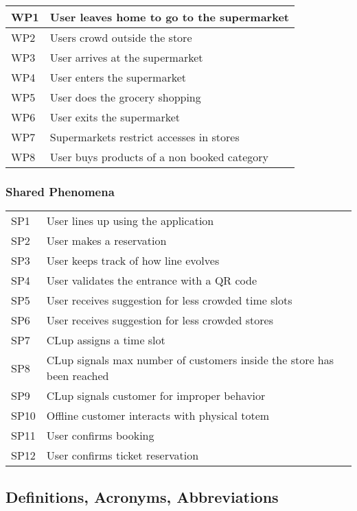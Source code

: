 \begin{tabular}{l|l}
	WP1 & User leaves home to go to the supermarket\\\hline
	WP2 & Users crowd outside the store\\\hline
    WP3 & User arrives at the supermarket\\\hline
    WP4 & User enters the supermarket \\\hline
	WP5 & User does the grocery shopping \\\hline
	WP6 & User exits the supermarket\\\hline
	WP7 & Supermarkets restrict accesses in stores\\\hline %
	WP8 & User buys products of a non booked category\\\hline %
\end{tabular}

\subsubsection{Shared Phenomena}
\begin{tabular}{l|l}
	SP1 & User lines up using the application \\
	SP2 & User makes a reservation \\
	SP3 & User keeps track of how line evolves \\
	SP4 & User validates the entrance with a QR code \\
	SP5 & User receives suggestion for less crowded time slots \\
	SP6 & User receives suggestion for less crowded stores \\
	SP7 & CLup assigns a time slot \\
	SP8 & CLup signals max number of customers inside the store has been reached \\
	SP9 & CLup signals customer for improper behavior \\
	SP10 & Offline customer interacts with physical totem \\
	SP11 & User confirms booking \\
	SP12 & User confirms ticket reservation \\
	
\end{tabular}

\subsection{Definitions, Acronyms, Abbreviations}

